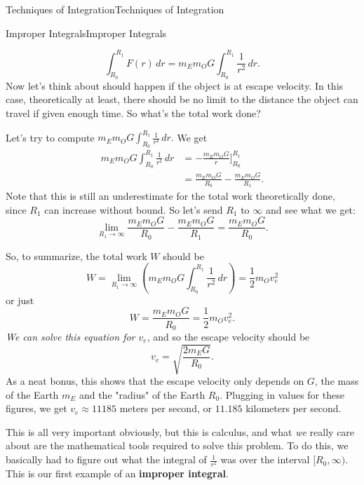 \documentclass[10pt,]{book}
\newcommand{\terminology}[1]{\textbf{#1}}
\numberwithin{equation}{section}
\begin{document}
\begin{chapterptx}{Techniques of Integration}{}{Techniques of Integration}{}{}
\begin{sectionptx}{Improper Integrals}{}{Improper Integrals}{}{}
\begin{introduction}{}
\begin{equation*}
\int_{R_{0}}^{R_{1}}F(r)\,dr = m_{E}m_{O}G\int_{R_{0}}^{R_{1}}\frac{1}{r^{2}}\,dr.
\end{equation*}
Now let's think about should happen if the object is at escape velocity. In this case, theoretically at least, there should be no limit to the distance the object can travel if given enough time. So what's the total work done?%
\par
\hypertarget{p-576}{}%
Let's try to compute \(m_{E}m_{O}G\int_{R_{0}}^{R_{1}}\frac{1}{r^{2}}\,dr.\) We get%
\begin{align*}
m_{E}m_{O}G\int_{R_{0}}^{R_{1}}\frac{1}{r^{2}}\,dr & = -\frac{m_{E}m_{O}G}{r}\big]_{R_{0}}^{R_{1}} \\
& = \frac{m_{E}m_{O}G}{R_{0}} - \frac{m_{E}m_{O}G}{R_{1}}. 
\end{align*}
Note that this is still an underestimate for the total work theoretically done, since \(R_{1}\) can increase without bound. So let's send \(R_{1}\) to \(\infty\) and see what we get:%
\begin{equation*}
\lim_{R_{1}\to\infty}\frac{m_{E}m_{O}G}{R_{0}} - \frac{m_{E}m_{O}G}{R_{1}} = \frac{m_{E}m_{O}G}{R_{0}}.
\end{equation*}
%
\par
\hypertarget{p-577}{}%
So, to summarize, the total work \(W\) should be%
\begin{equation*}
W = \lim_{R_{1}\to\infty}\left(m_{E}m_{O}G\int_{R_{0}}^{R_{1}}\frac{1}{r^{2}}\,dr\right) = \frac{1}{2}m_{O}v_{e}^{2}
\end{equation*}
or just%
\begin{equation*}
W = \frac{m_{E}m_{O}G}{R_{0}} = \frac{1}{2}m_{O}v_{e}^{2}.
\end{equation*}
\emph{We can solve this equation for \(v_{e}\)}, and so the escape velocity should be%
\begin{equation*}
v_{e} = \sqrt{\frac{2 m_{E}G}{R_{0}}}.
\end{equation*}
As a neat bonus, this shows that the escape velocity only depends on \(G\), the mass of the Earth \(m_{E}\) and the "radius" of the Earth \(R_{0}\). Plugging in values for these figures, we get \(v_{e} \approx 11185\) meters per second, or \(11.185\) kilometers per second.%
\par
\hypertarget{p-578}{}%
This is all very important obviously, but this is calculus, and what \emph{we} really care about are the mathematical tools required to solve this problem. To do this, we basically had to figure out what the integral of \(\frac{1}{r^{2}}\) was over the interval \([R_{0},\infty)\). This is our first example of an \terminology{improper integral}.%

\end{introduction}
\end{sectionptx}
\end{chapterptx}
\end{document}
